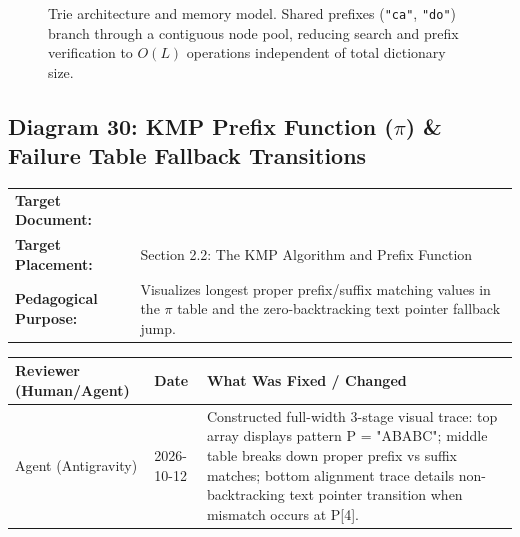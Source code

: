 \documentclass[11pt,a4paper]{article}
\newcommand{\breadcrumb}[3]{
    \par\vspace{0.15cm}
    \noindent\begin{tabularx}{\textwidth}{|l|X|}
    \hline
    \textbf{Target Document:} & \texttt{\detokenize{#1}} \\
    \textbf{Target Placement:} & #2 \\
    \textbf{Pedagogical Purpose:} & #3 \\
    \hline
    \end{tabularx}
    \vspace{0.15cm}\par
}
\newcommand{\diagramaudit}[3]{
    \par\vspace{0.12cm}
    \noindent\begin{tabularx}{\textwidth}{|l|l|>{\raggedright\arraybackslash}X|}
    \hline
    \textbf{Reviewer (Human/Agent)} & \textbf{Date} & \textbf{What Was Fixed / Changed} \\ \hline
    #1 & #2 & #3 \\ \hline
    \end{tabularx}
    \vspace{0.12cm}\par
}
\begin{document}
\begin{figure}[htbp]
{}
\caption{Trie architecture and memory model. Shared prefixes (\texttt{"ca"}, \texttt{"do"}) branch through a contiguous node pool, reducing search and prefix verification to $O(L)$ operations independent of total dictionary size.}
\end{figure}

\newpage
\newpage
\newpage

\subsection{Diagram 30: KMP Prefix Function (\texorpdfstring{$\pi$}{pi}) \& Failure Table Fallback Transitions}

\breadcrumb{09.string_algorithms.tex}{Section 2.2: The KMP Algorithm and Prefix Function}{Visualizes longest proper prefix/suffix matching values in the $\pi$ table and the zero-backtracking text pointer fallback jump.}

\diagramaudit{Agent (Antigravity)}{2026-10-12}{Constructed full-width 3-stage visual trace: top array displays pattern P = "ABABC"; middle table breaks down proper prefix vs suffix matches; bottom alignment trace details non-backtracking text pointer transition when mismatch occurs at P[4].}
\end{document}
